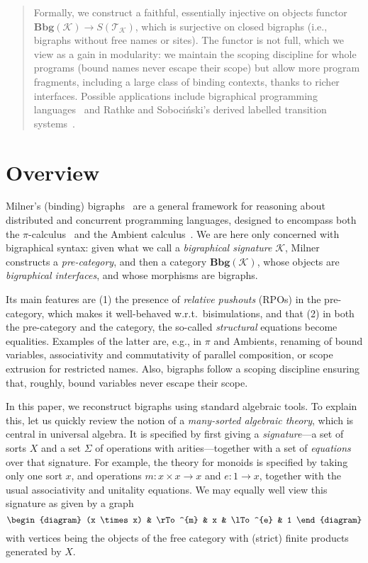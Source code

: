 \documentclass{llncs}
\newcommand{\cat}[1]{\mathbf{#1}}
\newcommand{\fonc}[1]{\mathsf{#1}}
\newcommand{\bsig}{\mathcal{K}} \newcommand{\model}{\mathcal{L}} \newcommand{\bbig}{\cat{Bbg}} \newcommand{\T}{\fonc{T}} \newcommand{\theory}{\mathcal{T}}
\newcommand{\sig}{\Sigma}
\begin{document}
\begin{abstract}
  Formally, we construct a faithful, essentially injective on objects
  functor $\bbig (\bsig) \to S(\theory_\bsig)$, which is surjective on
  closed bigraphs (i.e., bigraphs without free names or sites).  The
  functor is not full, which we view as a gain in modularity: we
  maintain the scoping discipline for whole programs (bound names
  never escape their scope) but allow more program fragments,
  including a large class of binding contexts, thanks to richer
  interfaces.  Possible applications include bigraphical programming
  languages~\cite{Damgaard:Matching} and Rathke and Soboci\'{n}ski's
  derived labelled transition systems~\cite{modularLTS}.
  \end{abstract}

\section{Overview}
Milner's (binding) bigraphs~\cite{Milner:bigraphs} are a general
framework for reasoning about distributed and concurrent programming
languages, designed to encompass both the
$\pi$-calculus~\cite{Milner:pi} and the Ambient
calculus~\cite{Ambients}.  We are here only concerned with bigraphical
syntax: given what we call a \emph{bigraphical signature} $\bsig$,
Milner constructs a \emph{pre-category}, and then a category $\bbig
(\bsig)$, whose objects are \emph{bigraphical interfaces}, and whose
morphisms are bigraphs.

Its main features are (1) the presence of \emph{relative pushouts}
(RPOs) in the pre-category, which makes it well-behaved w.r.t.\
bisimulations, and that (2) in both the pre-category and the category,
the so-called \emph{structural} equations become equalities. Examples
of the latter are, e.g., in $\pi$ and Ambients, renaming of bound
variables, associativity and commutativity of parallel composition, or
scope extrusion for restricted names. Also, bigraphs follow a scoping
discipline ensuring that, roughly, bound variables never escape their
scope.

In this paper, we reconstruct bigraphs using standard algebraic tools.
To explain this, let us quickly review the notion of a
\emph{many-sorted algebraic theory}, which is central in universal
algebra. It is specified by first giving a \emph{signature}---a set of
sorts $X$ and a set $\sig$ of operations with arities---together with
a set of \emph{equations} over that signature. For example, the theory
for monoids is specified by taking only one sort $x$, and operations
$m: x \times x \to x$ and $e: 1 \to x$, together with the usual
associativity and unitality equations. We may equally well view this
signature as given by a graph
\begin{equation}
 \begin{diagram}
  (x \times x) & \rTo^{m} & x & \lTo^{e} & 1
\end{diagram}\label{eq:monoid}
\end{equation}
with vertices being the objects of the free category with (strict)
finite products generated by $X$.
\end{document}
